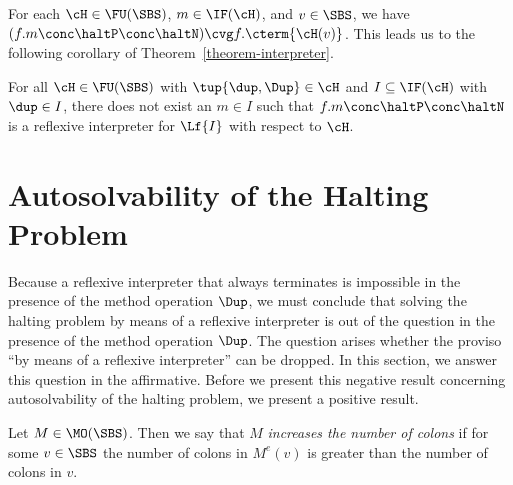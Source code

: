 \documentclass[fleqn]{llncs}
\begin{document}
For each $\cH \in \FU(\SBS)$, $m \in \IF(\cH)$, and $v \in \SBS$,
we have $(f.m \conc \haltP \conc \haltN) \cvg f.\cterm{\cH(v)}$.
This leads us to the following corollary of
Theorem~\ref{theorem-interpreter}.
\begin{corollary}
\label{corollary-interpreter}
For all $\cH \in \FU(\SBS)$ with $\tup{\dup,\Dup} \in \cH$ and
$I \subseteq \IF(\cH)$ with $\dup \in I$, there does not exist an
$m \in I$ such that $f.m \conc \haltP \conc \haltN$ is a reflexive
interpreter for $\Lf{I}$ with respect to $\cH$.
\end{corollary}

\section{Autosolvability of the Halting Problem}
\label{sect-autosolvability}

Because a reflexive interpreter that always terminates is impossible in
the presence of the method operation $\Dup$, we must conclude that
solving the halting problem by means of a reflexive interpreter is out
of the question in the presence of the method operation $\Dup$.
The question arises whether the proviso ``by means of a reflexive
interpreter'' can be dropped.
In this section, we answer this question in the affirmative.
Before we present this negative result concerning autosolvability of the
halting problem, we present a positive result.

Let $M \in \MO(\SBS)$.
Then we say that $M$ \emph{increases the number of colons} if for some
$v \in \SBS$ the number of colons in $M^e(v)$ is greater than the number
of colons in $v$.
\end{document}
